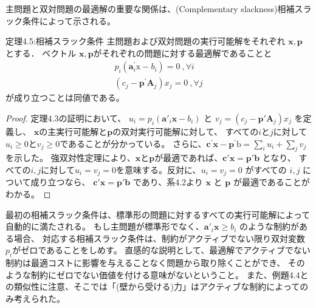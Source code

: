 \documentclass{jsarticle}
\begin{document}
主問題と双対問題の最適解の重要な関係は、(Complementary slackness)相補スラック条件によって示される。
\begin{itembox}[l]{定理4.5:相補スラック条件}
  主問題および双対問題の実行可能解をそれぞれ $\bm{x},\bm{p}$ とする．
  ベクトル $\bm{x},\bm{p}$がそれぞれの問題に対する最適解であることと
  \begin{equation}
    \begin{array}{r}
    p_{i}\left(\mathbf{a}_{i}^{\prime} \mathrm{x}-b_{i}\right)=0 \:,\forall i\\
    \left(c_{j}-\mathbf{p}^{\prime} \mathbf{A}_{j}\right) x_{j}=0\:,\forall j
    \end{array}
  \end{equation}
  が成り立つことは同値である。
\end{itembox}
\begin{proof}
  定理4.3の証明において、 $u_i = p_i(\bm{a}'_i\bm{x}-b_i)$ と $v_j = (c_j-\bm{p}'\bm{A}_j)x_j$ を定義し、 
  $\bm{x}$の主実行可能解と$\bm{p}$の双対実行可能解に対して、 すべての$i$と$j$に対して$u_i\geq 0$と$v_j\geq 0$であることが分かっている。
  さらに、$\mathbf{c}^{\prime} \mathbf{x}-\mathbf{p}^{\prime} \mathrm{b}=\sum_{i} u_{i}+\sum_{j} v_{j}$を示した。
  強双対性定理により、$\bm{x}$と$\bm{p}$が最適であれば、$\bm{c}'\bm{x} = \bm{p}'\bm{b}$ となり、
  すべての$i , j$に対して$u_i = v_j = 0$を意味する。反対に、$u_i = v_j = 0$ がすべての $i , j$ について成り立つなら、
  $\bm{c}'\bm{x} = \bm{p}'\bm{b}$ であり、系4.2より $\bm{x}$ と $\bm{p}$ が最適であることがわかる。
\end{proof}

最初の相補スラック条件は、標準形の問題に対するすべての実行可能解によって自動的に満たされる。
もし主問題が標準形でなく、$\bm{a}'_i\bm{x} \geq b_i$ のような制約がある場合、
対応する相補スラック条件は、制約がアクティブでない限り双対変数$p_i$がゼロであることをしめす。
直感的な説明として、最適解でアクティブでない制約は最適コストに影響を与えることなく問題から取り除くことができ、
そのような制約にゼロでない価値を付ける意味がないということ。
また、例題4.4との類似性に注意、そこでは「(壁から受ける)力」はアクティブな制約によってのみ考えられた。
\end{document}
